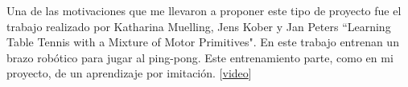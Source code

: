 

Una de las motivaciones que me llevaron a proponer este tipo de proyecto fue el trabajo realizado por Katharina Muelling, Jens Kober y Jan Peters ``Learning Table Tennis with a Mixture of Motor Primitives"\cite{table_tennis}. En este trabajo entrenan un brazo robótico para jugar al ping-pong. Este entrenamiento parte, como en mi proyecto, de un aprendizaje por imitación. [\href{https://www.youtube.com/watch?v=SH3bADiB7uQ}{video}]


